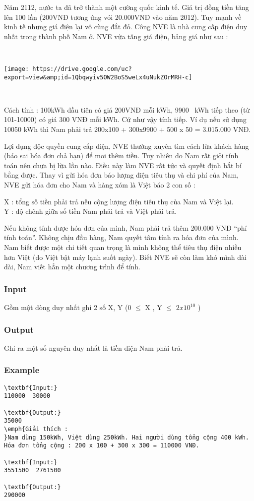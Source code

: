 

Năm 2112, nước ta đã trở thành một cường quốc kinh tế. Giá trị đồng tiền tăng lên 100 lần (200VNĐ tương ứng vói 20.000VNĐ vào năm 2012). Tuy mạnh về kinh tế nhưng giá điện lại vô cùng đắt đỏ. Công NVE là nhà cung cấp điện duy nhất trong thành phố Nam ở. NVE vừa tăng giá điện, bảng giá như sau :

 


\texttt{[image: https://drive.google.com/uc?export=view\&amp;id=1Qbqwyiv5OW2BoS5weLx4uNukZOrMRH-c]}

 

Cách tính : 100kWh đầu tiên có giá 200VNĐ mỗi kWh, 9900  kWh tiếp theo (từ 101-10000) có giá 300 VNĐ mỗi kWh. Cứ như vậy tính tiếp. Ví dụ nếu sử dụng 10050 kWh thì Nam phải trả 200x100 + 300x9900 + 500 x 50 = 3.015.000 VNĐ.

Lợi dụng độc quyền cung cấp điện, NVE thường xuyên tìm cách lừa khách hàng (báo sai hóa đơn chả hạn) để moi thêm tiền. Tuy nhiên do Nam rất giỏi tính toán nên chưa bị lừa lần nào. Điều này làm NVE rất tức và quyết định bắt bí bằng được. Thay vì gửi hóa đơn báo lượng điện tiêu thụ và chi phí của Nam, NVE gửi hóa đơn cho Nam và hàng xóm là Việt báo 2 con số :

X : tổng số tiền phải trả nếu cộng lượng điện tiêu thụ của Nam và Việt lại.
\\Y : độ chênh giữa số tiền Nam phải trả và Việt phải trả.

Nếu không tính được hóa đơn của mình, Nam phải trả thêm 200.000 VNĐ “phí tính toán”. Không chịu đầu hàng, Nam quyết tâm tính ra hóa đơn của mình. Nam biết được một chi tiết quan trọng là mình không thể tiêu thụ điện nhiều hơn Việt (do Việt bật máy lạnh suốt ngày). Biết NVE sẽ còn làm khó mình dài dài, Nam viết hẳn một chương trình để tính.

\subsubsection{Input}

Gồm một dòng duy nhất ghi 2 số X, Y (0  $\le$  X , Y $\le$  $2x10^{10}$ )

\subsubsection{Output}

Ghi ra một số nguyên duy nhất là tiền điện Nam phải trả.

\subsubsection{Example}
\begin{verbatim}
\textbf{Input:}
110000  30000

\textbf{Output:}
35000
\emph{Giải thích : 
}Nam dùng 150kWh, Việt dùng 250kWh. Hai người dùng tổng cộng 400 kWh. 
Hóa đơn tổng cộng : 200 x 100 + 300 x 300 = 110000 VNĐ.

\textbf{Input:}
3551500  2761500

\textbf{Output:}
290000

\end{verbatim}

\emph{ }
